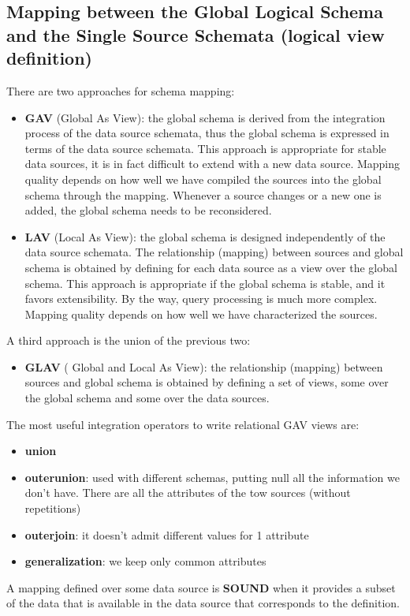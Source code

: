 \documentclass[10pt,a4paper]{article}
\begin{document}
\subsection{Mapping between the Global Logical Schema and the Single Source Schemata (logical view definition)}
There are two approaches for schema mapping:
\begin{itemize}
	\item \textbf{GAV} (Global As View): the global schema is derived from the integration process of the data source schemata, thus the global schema is expressed in terms of the data source schemata. This approach is appropriate for stable data sources, it is in fact difficult to extend with a new data source. Mapping quality depends on how well we have compiled the sources into the global schema through the mapping. Whenever a source changes or a new one is added, the global schema needs to be reconsidered.
	\item \textbf{LAV} (Local As View): the global schema is designed independently of the data source schemata. The relationship (mapping) between sources and global schema is obtained by defining for each data source as a view over the global schema. This approach is appropriate if the global schema is stable, and it favors extensibility. By the way, query processing is much more complex. Mapping quality depends on how well we have characterized the sources. 
\end{itemize}
A third approach is the union of the previous two:
\begin{itemize}
	\item \textbf{GLAV} ( Global and Local As View): the relationship (mapping) between sources and global schema is obtained by defining a set of views, some over the global schema and some over the data sources.
\end{itemize}
The most useful integration operators to write relational GAV views are:
\begin{itemize}
	\item \textbf{union}
	\item \textbf{outerunion}: used with different schemas, putting null all the information we don’t have. There are all the attributes of the tow sources (without repetitions)
	\item \textbf{outerjoin}: it doesn’t admit different values for 1 attribute
	\item \textbf{generalization}: we keep only common attributes
\end{itemize}
A mapping defined over some data source is \textbf{SOUND} when it provides a subset of the data that is available in the data source that corresponds to the definition. \\
\end{document}
